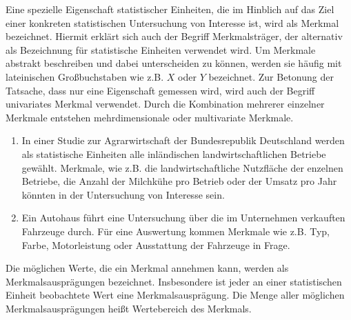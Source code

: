 \documentclass{lecture}
\begin{document}
    Eine spezielle Eigenschaft statistischer Einheiten, die im Hinblich auf das Ziel einer konkreten statistischen Untersuchung von Interesse ist, wird als Merkmal bezeichnet.
    Hiermit erklärt sich auch der Begriff Merkmalsträger, der alternativ als Bezeichnung für statistische Einheiten verwendet wird.
    Um Merkmale abstrakt beschreiben und dabei unterscheiden zu können, werden sie häufig mit lateinischen Großbuchstaben wie z.B. \(X\) oder \(Y\) bezeichnet.
    Zur Betonung der Tatsache, dass nur eine Eigenschaft gemessen wird, wird auch der Begriff univariates Merkmal verwendet.
    Durch die Kombination mehrerer einzelner Merkmale entstehen mehrdimensionale oder multivariate Merkmale.

    \begin{example}
        \begin{enumerate}
            \item In einer Studie zur Agrarwirtschaft der Bundesrepublik Deutschland werden als statistische Einheiten alle inländischen landwirtschaftlichen Betriebe gewählt.
            Merkmale, wie z.B. die landwirtschaftliche Nutzfläche der enzelnen Betriebe, die Anzahl der Milchkühe pro Betrieb oder der Umsatz pro Jahr könnten in der Untersuchung von Interesse sein.
            \item Ein Autohaus führt eine Untersuchung über die im Unternehmen verkauften Fahrzeuge durch.
            Für eine Auswertung kommen Merkmale wie z.B. Typ, Farbe, Motorleistung oder Ausstattung der Fahrzeuge in Frage.
        \end{enumerate}
    \end{example}

    Die möglichen Werte, die ein Merkmal annehmen kann, werden als Merkmalsausprägungen bezeichnet.
    Insbesondere ist jeder an einer statistischen Einheit beobachtete Wert eine Merkmalsausprägung.
    Die Menge aller möglichen Merkmalsausprägungen heißt Wertebereich des Merkmals.
\end{document}
